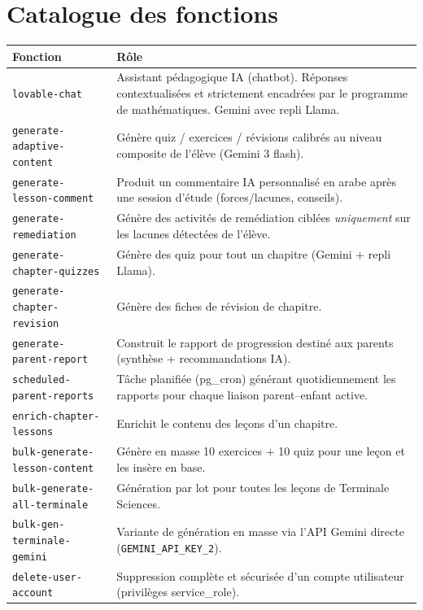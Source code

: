 \section{Catalogue des fonctions}
\begin{longtable}{p{5cm}p{9.5cm}}
\toprule \textbf{Fonction} & \textbf{Rôle} \\ \midrule \endhead
\texttt{lovable-chat} & Assistant pédagogique IA (chatbot). Réponses
contextualisées et strictement encadrées par le programme de mathématiques.
Gemini avec repli Llama. \\
\texttt{generate-adaptive-content} & Génère quiz / exercices / révisions
calibrés au niveau composite de l'élève (Gemini 3 flash). \\
\texttt{generate-lesson-comment} & Produit un commentaire IA personnalisé en
arabe après une session d'étude (forces/lacunes, conseils). \\
\texttt{generate-remediation} & Génère des activités de remédiation ciblées
\emph{uniquement} sur les lacunes détectées de l'élève. \\
\texttt{generate-chapter-quizzes} & Génère des quiz pour tout un chapitre
(Gemini + repli Llama). \\
\texttt{generate-chapter-revision} & Génère des fiches de révision de chapitre. \\
\texttt{generate-parent-report} & Construit le rapport de progression destiné
aux parents (synthèse + recommandations IA). \\
\texttt{scheduled-parent-reports} & Tâche planifiée (pg\_cron) générant
quotidiennement les rapports pour chaque liaison parent--enfant active. \\
\texttt{enrich-chapter-lessons} & Enrichit le contenu des leçons d'un chapitre. \\
\texttt{bulk-generate-lesson-content} & Génère en masse 10 exercices + 10 quiz
pour une leçon et les insère en base. \\
\texttt{bulk-generate-all-terminale} & Génération par lot pour toutes les leçons
de Terminale Sciences. \\
\texttt{bulk-gen-terminale-gemini} & Variante de génération en masse via l'API
Gemini directe (\texttt{GEMINI\_API\_KEY\_2}). \\
\texttt{delete-user-account} & Suppression complète et sécurisée d'un compte
utilisateur (privilèges service\_role). \\
\bottomrule
\end{longtable}

